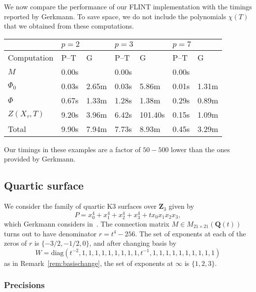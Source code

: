 \documentclass[a4paper,11pt]{article}
\numberwithin{equation}{section}
\newcommand{\ZZ}{\mathbf{Z}} %
\newcommand{\QQ}{\mathbf{Q}} %
\theoremstyle{definition}
\begin{document}
We now compare the performance of our FLINT implementation with the 
timings reported by Gerkmann. To save space, we do not include the 
polynomials $\chi(T)$ that we obtained from these computations.

\begin{center}
\begin{tabular}{l l l l l l l} \toprule
                & \multicolumn{2}{l}{$p = 2$} 
                & \multicolumn{2}{l}{$p = 3$} 
                & \multicolumn{2}{l}{$p = 7$} \\ \midrule
Computation     & P--T & G     & P--T  & G       & P--T & G     \\ \midrule
$M$             & 0.00s&       & 0.00s &         & 0.00s&       \\
$\Phi_0$        & 0.03s& 2.65m & 0.03s & 5.86m   & 0.01s& 1.31m \\
$\Phi$          & 0.67s& 1.33m & 1.28s & 1.38m   & 0.29s& 0.89m \\
$Z(X_{\tau},T)$ & 9.20s& 3.96m & 6.42s & 101.40s & 0.15s& 1.09m \\
Total           & 9.90s& 7.94m & 7.73s & 8.93m   & 0.45s& 3.29m \\ \bottomrule
\end{tabular} 
\end{center}

\bigskip

Our timings in these examples are a factor of $50-500$ lower than the ones 
provided by Gerkmann.

\subsection{Quartic surface}

We consider the family of quartic K3 surfaces over $\ZZ_3$ given by
\begin{equation*}
P=x_0^4 + x_1^4 + x_2^4 + x_3^4 + t x_0 x_1 x_2 x_3,
\end{equation*}
which Gerkmann considers in~\citep[\S 7.5]{Gerkmann2007}. The connection matrix 
$M \in M_{21 \times 21}(\QQ(t))$ turns out to have denominator 
$r=t^4-256$. The set of exponents at each of the zeros of $r$ is $\{-3/2,-1/2,0\}$, 
and after changing basis by
\[
W=\mbox{diag}(t^{-2},1,1,1,1,1,1,1,1,1,t^{-1},1,1,1,1,1,1,1,1,1,1)
\] 
as in Remark~\ref{rem:basischange}, the set of exponents  at $\infty$ is 
$\{1,2,3\}$. 

\subsubsection{Precisions}
\end{document}
